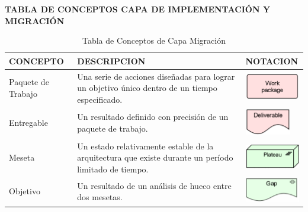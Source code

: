 \begin{table}[H]
	\centering\textbf{TABLA DE CONCEPTOS CAPA DE IMPLEMENTACIÓN Y MIGRACIÓN}
	\centering
	\begin{tabular}{| m{4cm} | m{4cm} | m{4cm} | }
		\hline
		\centering\vspace{1.52mm}CONCEPTO & \centering\vspace{1.52mm}DESCRIPCION &\vspace{1.52mm}NOTACION \\
		\hline
		\centering\vspace{1.52mm}Paquete de Trabajo& \vspace{1.52mm}Una serie de acciones diseñadas para lograr un objetivo único dentro de un tiempo especificado.& \vspace{1.52mm}\includegraphics[width=25mm]{arquitectura/imagenes/61} \\
		\hline
		\centering\vspace{1.52mm}Entregable& \vspace{1.52mm}Un resultado definido con precisión de un paquete de trabajo.& \vspace{1.52mm}\includegraphics[width=20mm]{arquitectura/imagenes/62} \\
		\hline
		\centering\vspace{1.52mm}Meseta& \vspace{1.52mm}Un estado relativamente estable de la arquitectura que existe durante un período limitado de tiempo.& \vspace{1.52mm}\includegraphics[width=25mm]{arquitectura/imagenes/63} \\
		\hline
		\centering\vspace{1.52mm}Objetivo& \vspace{1.52mm}Un resultado de un análisis de hueco entre dos mesetas.& \vspace{1.52mm}\includegraphics[width=25mm]{arquitectura/imagenes/64} \\
		\hline
	\end{tabular}
	\caption{Tabla de Conceptos de Capa Migración}
	\label{fig:migracion}
\end{table}

